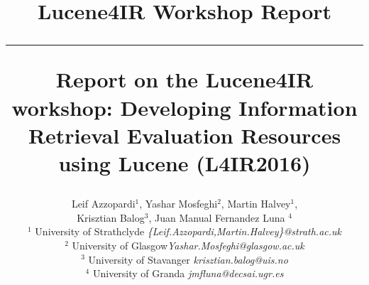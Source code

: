 \documentclass[12pt]{article}
\begin{document}
\title{\vspace{-2.5cm}
\begin{center}
\textbf{\small{Lucene4IR Workshop Report}}\\\vspace{-0.5cm} \rule{17.5cm}{1pt}
\end{center}
\vspace{1cm}\textbf{Report on the Lucene4IR workshop: Developing Information Retrieval Evaluation Resources using Lucene (L4IR2016) }}

\newcommand{\todo}[1]{\textcolor{red}{#1}}
\author{
Leif Azzopardi$^{1}$, Yashar Mosfeghi$^{2}$, Martin Halvey$^{1}$, \\Krisztian Balog$^{3}$, Juan Manual Fernandez Luna $^{4}$\\
    $^{1}$ {\small University of Strathclyde  \emph{ \{Leif.Azzopardi,Martin.Halvey\}@strath.ac.uk}}\\
    $^{2}$ {\small University of Glasgow\emph{\small Yashar.Mosfeghi@glasgow.ac.uk}}\\
	$^{3}$ {\small University of Stavanger \emph{\small krisztian.balog@uis.no}}\\
	$^{4}$ {\small University of Granda \emph{\small jmfluna@decsai.ugr.es}}
}
\end{document}

